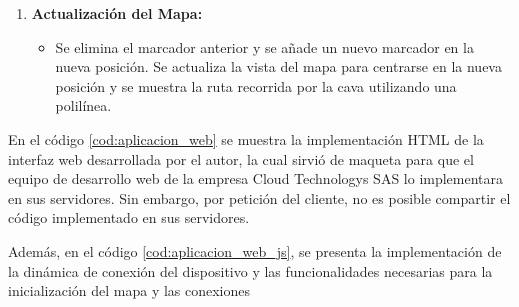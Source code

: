 \begin{enumerate}
	\item \textbf{Actualización del Mapa:}
		\begin{itemize}
		\item Se elimina el marcador anterior y se añade un nuevo marcador en la nueva posición. Se actualiza la vista del mapa para centrarse en la nueva posición y se muestra la ruta recorrida por la cava utilizando una polilínea.
		\end{itemize}

\end{enumerate}


En el código \ref{cod:aplicacion_web} se muestra la implementación HTML de la interfaz web desarrollada por el autor, la cual sirvió de maqueta para que el equipo de desarrollo web de la empresa Cloud Technologys SAS lo implementara en sus servidores. Sin embargo, por petición del cliente, no es posible compartir el código implementado en sus servidores. 

Además, en el código \ref{cod:aplicacion_web_js}, se presenta la implementación de la dinámica de conexión del dispositivo y las funcionalidades necesarias para la inicialización del mapa y las conexiones 

